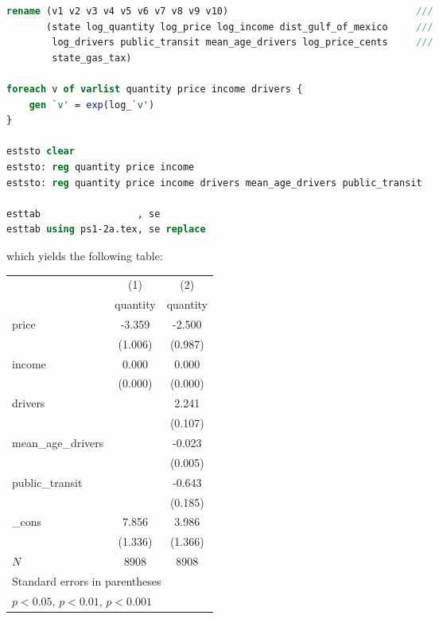 \documentclass[answers, reflections]{padajar-pset}
\begin{document}
\begin{questions}
\begin{parts}
\begin{solution}
\begin{lstlisting}[language=Stata]
rename (v1 v2 v3 v4 v5 v6 v7 v8 v9 v10)									///
	   (state log_quantity log_price log_income dist_gulf_of_mexico		///
		log_drivers public_transit mean_age_drivers log_price_cents		///
		state_gas_tax)

foreach v of varlist quantity price income drivers {
	gen `v' = exp(log_`v')
}

eststo clear
eststo: reg quantity price income
eststo: reg quantity price income drivers mean_age_drivers public_transit

esttab                 , se
esttab using ps1-2a.tex, se replace\end{lstlisting}

		which yields the following table:
		\begin{center}
			\small{
				\begin{tabular}{l*{2}{c}}
					\hline\hline
					&\multicolumn{1}{c}{(1)}&\multicolumn{1}{c}{(2)}\\
					&\multicolumn{1}{c}{quantity}&\multicolumn{1}{c}{quantity}\\
					\hline
					price       &      -3.359\sym{***}&      -2.500\sym{*}  \\
					&     (1.006)         &     (0.987)         \\
					[1em]
					income      &       0.000\sym{***}&       0.000\sym{***}\\
					&     (0.000)         &     (0.000)         \\
					[1em]
					drivers     &                     &       2.241\sym{***}\\
					&                     &     (0.107)         \\
					[1em]
					mean\_age\_drivers&                     &      -0.023\sym{***}\\
					&                     &     (0.005)         \\
					[1em]
					public\_transit&                     &      -0.643\sym{***}\\
					&                     &     (0.185)         \\
					[1em]
					\_cons      &       7.856\sym{***}&       3.986\sym{**} \\
					&     (1.336)         &     (1.366)         \\
					\hline
					\(N\)       &        8908         &        8908         \\
					\hline\hline
					\multicolumn{3}{l}{\footnotesize Standard errors in parentheses}\\
					\multicolumn{3}{l}{\footnotesize \sym{*} \(p<0.05\), \sym{**} \(p<0.01\), \sym{***} \(p<0.001\)}\\
				\end{tabular}
			}
		\end{center}
	\end{solution}

\end{parts}
\end{questions}
\end{document}
